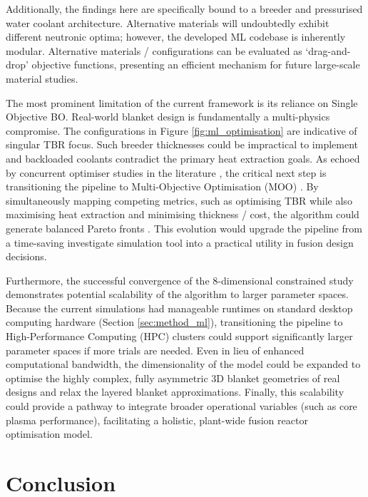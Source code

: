 \documentclass[11pt]{article}
\begin{document}
Additionally, the findings here are specifically bound to a  breeder and
pressurised water coolant architecture. Alternative materials will undoubtedly exhibit different
neutronic optima; however, the developed ML codebase \citep{khan2026fusionmlcode} is inherently
modular. Alternative materials / configurations can be evaluated as `drag-and-drop' objective
functions, presenting an efficient mechanism for future large-scale material studies.

The most prominent limitation of the current framework is its reliance on Single Objective BO.
Real-world blanket design is fundamentally a multi-physics compromise. The configurations in Figure
\ref{fig:ml_optimisation} are indicative of singular TBR focus. Such breeder thicknesses could be
impractical to implement and backloaded coolants contradict the primary heat extraction goals. As
echoed by concurrent optimiser studies in the literature \citep{humphrey_accelerating_2026}, the
critical next step is transitioning the pipeline to Multi-Objective Optimisation (MOO)
\citep{emmerich2005single}. By simultaneously mapping competing metrics, such as optimising TBR
while also maximising heat extraction and minimising thickness / cost, the algorithm could generate
balanced Pareto fronts \cite{knowles_parego_2006}. This evolution would upgrade the pipeline from a
time-saving investigate simulation tool into a practical utility in fusion design decisions.

Furthermore, the successful convergence of the 8-dimensional constrained study demonstrates
potential scalability of the algorithm to larger parameter spaces. Because the current simulations
had manageable runtimes on standard desktop computing hardware (Section \ref{sec:method_ml}),
transitioning the pipeline to High-Performance Computing (HPC) clusters could support significantly
larger parameter spaces if more trials are needed. Even in lieu of enhanced computational bandwidth,
the dimensionality of the model could be expanded to optimise the highly complex, fully asymmetric
3D blanket geometries of real designs and relax the layered blanket approximations. Finally, this
scalability could provide a pathway to integrate broader operational variables (such as core plasma
performance), facilitating a holistic, plant-wide fusion reactor optimisation model.


\section{Conclusion}
\label{sec:conclusion}
\end{document}
